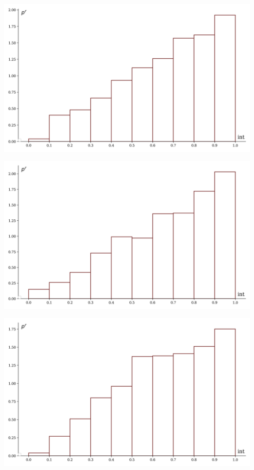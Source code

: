 \documentclass[a4paper, 14pt]{extarticle}
\begin{document}
\begin{minipage}[t]{0.25\textwidth}
\includegraphics[width=\textwidth, height=\textheight, keepaspectratio]{sample13_hist}
\end{minipage}%
\begin{minipage}[t]{0.25\textwidth}
\includegraphics[width=\textwidth, height=\textheight, keepaspectratio]{sample14_hist}
\end{minipage}%
\begin{minipage}[t]{0.25\textwidth}
\includegraphics[width=\textwidth, height=\textheight, keepaspectratio]{sample15_hist}
\end{minipage}%
\end{document}

